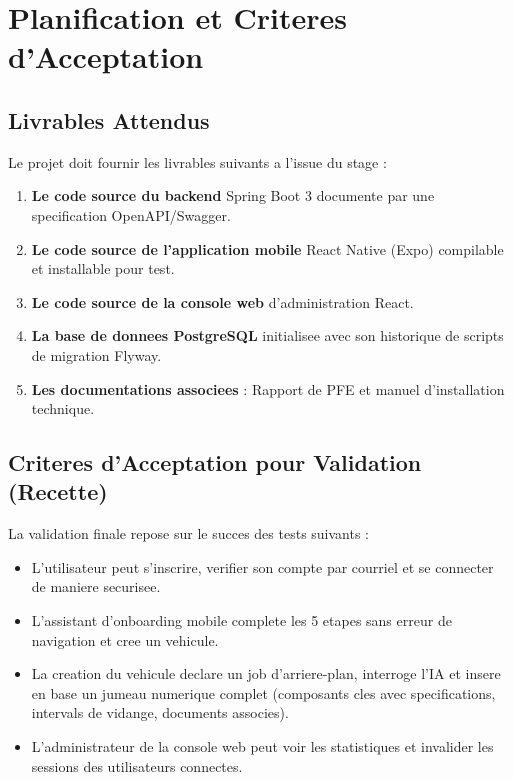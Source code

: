 \documentclass[11pt,a4paper]{report}
\begin{document}
\chapter{Planification et Criteres d'Acceptation}

\section{Livrables Attendus}
Le projet doit fournir les livrables suivants a l'issue du stage :
\begin{enumerate}
    \item \textbf{Le code source du backend} Spring Boot 3 documente par une specification OpenAPI/Swagger.
    \item \textbf{Le code source de l'application mobile} React Native (Expo) compilable et installable pour test.
    \item \textbf{Le code source de la console web} d'administration React.
    \item \textbf{La base de donnees PostgreSQL} initialisee avec son historique de scripts de migration Flyway.
    \item \textbf{Les documentations associees} : Rapport de PFE et manuel d'installation technique.
\end{enumerate}

\section{Criteres d'Acceptation pour Validation (Recette)}
La validation finale repose sur le succes des tests suivants :
\begin{itemize}[label=\textbullet]
    \item[\checkmark] L'utilisateur peut s'inscrire, verifier son compte par courriel et se connecter de maniere securisee.
    \item[\checkmark] L'assistant d'onboarding mobile complete les 5 etapes sans erreur de navigation et cree un vehicule.
    \item[\checkmark] La creation du vehicule declare un job d'arriere-plan, interroge l'IA et insere en base un jumeau numerique complet (composants cles avec specifications, intervals de vidange, documents associes).
    \item[\checkmark] L'administrateur de la console web peut voir les statistiques et invalider les sessions des utilisateurs connectes.
\end{itemize}
\end{document}
